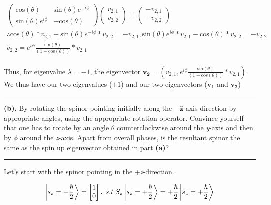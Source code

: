    \begin{gather*}
        \begin{pmatrix}
            \textrm{cos}(\theta) & \textrm{sin}(\theta)e^{-i\phi} \\
            \textrm{sin}(\theta)e^{i\phi} & -\textrm{cos}(\theta)
        \end{pmatrix}
        \begin{pmatrix}
            v_{2,1} \\
            v_{2,2}
        \end{pmatrix} = 
        \begin{pmatrix}
            -v_{2,1} \\
            -v_{2,2}
        \end{pmatrix} \\
        \therefore \textrm{cos}(\theta)*v_{2,1} + \textrm{sin}(\theta)e^{-i\phi}*v_{2,2} = -v_{2,1}, \textrm{sin}(\theta)e^{i\phi}*v_{2,1} - \textrm{cos}(\theta)*v_{2,2} = -v_{2,2} \\
        v_{2,2} = e^{i\phi}\frac{\textrm{sin}(\theta)}{(1 - \textrm{cos}(\theta))}*v_{2,1} \\
    \end{gather*}

    Thus, for eigenvalue $\lambda = -1$, the eigenvector $\mathbf{v_{2}} = (v_{2,1}, e^{i\phi}\frac{\textrm{sin}(\theta)}{(1 - \textrm{cos}(\theta))}*v_{2,1})$.\\
    We thus have our two eigenvalues ($\pm 1$) and our two eigenvectors ($\mathbf{v_{1}}$ and $\mathbf{v_{2}}$) \\
    \hrule

    \textbf{(b).} By rotating the spinor pointing initially along the $+\hat{\mathbf{z}}$ axis direction by appropriate angles, u\textrm{sin}g the appropriate rotation operator. Convince yourself that one has to rotate by an angle $\theta$ counterclockwise around the \textit{y}-axis and then by $\phi$ around the \textit{z}-axis. Apart from overall phases, is the resultant spinor the same as the spin up eigenvector obtained in part \textbf{(a)}? 
    \hrule  

    Let's start with the spinor pointing in the +\textit{z}-direction.

    \begin{equation*}
        \ket{s_{z} = +\frac{\hbar}{2}} = 
        \begin{bmatrix}
            1 \\
            0
        \end{bmatrix}, \; s.t \;  S_{z}\ket{s_{z} = +\frac{\hbar}{2}} = +\frac{\hbar}{2}\ket{s_{z} = +\frac{\hbar}{2}}
    \end{equation*}

